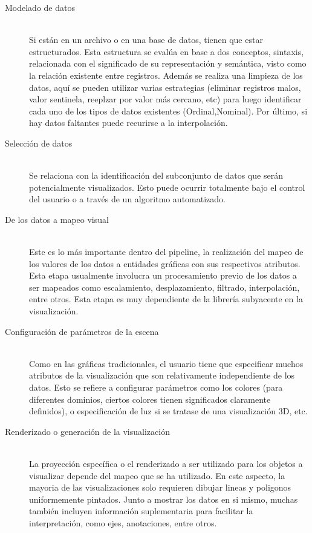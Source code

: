 \documentclass[12pt]{article}
\begin{document}
\begin{description}
	\item[Modelado de datos] \hfil \\
Si están en un archivo o en una base de datos, tienen que estar  estructurados. Esta estructura se evalúa en base a dos conceptos, sintaxis, relacionada con el significado de su representación y semántica, visto como la relación existente entre registros. Además se realiza una limpieza de los datos, aquí se pueden utilizar varias estrategias (eliminar registros malos, valor sentinela, reeplzar por valor más cercano, etc) para luego identificar cada uno de los tipos de datos existentes (Ordinal,Nominal). Por último, si hay datos faltantes puede recurirse a la interpolación.

	
	\item[Selección de datos] \hfill \\
Se relaciona con la identificación del subconjunto de datos que serán potencialmente visualizados. Esto puede ocurrir totalmente bajo el control del usuario o a través de un algoritmo automatizado.

	\item[De los datos a mapeo visual] \hfill \\
Este es lo más importante dentro del pipeline, la realización del mapeo de los valores de los datos a entidades gráficas con  sus respectivos atributos. Esta etapa usualmente involucra un procesamiento previo de los datos a ser mapeados como escalamiento, desplazamiento, filtrado, interpolación, entre otros. Esta etapa es muy dependiente de la librería subyacente en la visualización.

	\item[Configuración de parámetros de la escena] \hfill \\
Como en las gráficas tradicionales, el usuario tiene que especificar muchos atributos de la visualización que son relativamente independiente de los datos. Esto se refiere a configurar parámetros como los colores (para diferentes dominios, ciertos colores tienen significados claramente definidos), o especificación de luz si se tratase de una visualización 3D, etc.

	\item[Renderizado o generación de la visualización] \hfill \\
La proyección específica o el renderizado a ser utilizado para los objetos a visualizar depende del mapeo que se ha utilizado. En este aspecto, la mayoria de las visualizaciones solo requieren dibujar lineas y poligonos uniformemente pintados. Junto a mostrar los datos en si mismo, muchas también incluyen información suplementaria para facilitar la interpretación, como ejes, anotaciones, entre otros.

\end{description}
\end{document}
